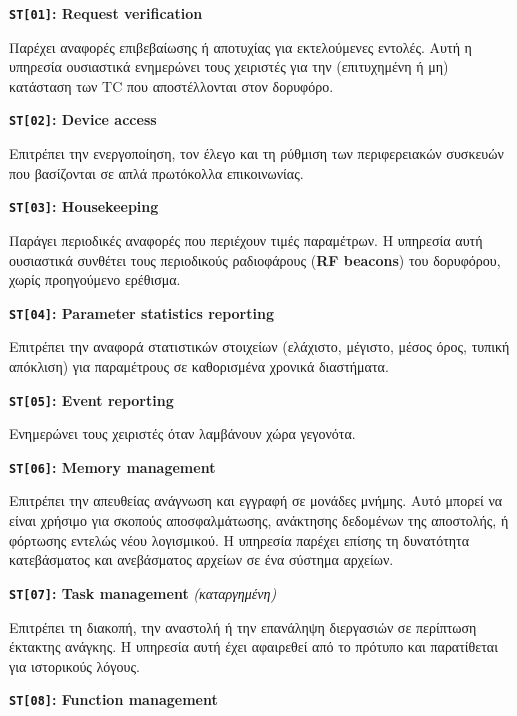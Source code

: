 \documentclass[a4paper,nobib]{tufte-book}
\begin{document}
\begin{compactitem}
	\item \textbf{\texttt{ST[01]}: Request verification}
	
	Παρέχει αναφορές επιβεβαίωσης ή αποτυχίας για εκτελούμενες εντολές. Αυτή η υπηρεσία ουσιαστικά ενημερώνει τους χειριστές για την (επιτυχημένη ή μη) κατάσταση των \ac{TC} που αποστέλλονται στον δορυφόρο.
	
	\item \textbf{\texttt{ST[02]}: Device access}
	
	Επιτρέπει την ενεργοποίηση, τον έλεγο και τη ρύθμιση των περιφερειακών συσκευών που βασίζονται σε απλά πρωτόκολλα επικοινωνίας.
	
	\item \textbf{\texttt{ST[03]}: Housekeeping}
		
		Παράγει περιοδικές αναφορές που περιέχουν τιμές παραμέτρων. Η υπηρεσία αυτή ουσιαστικά συνθέτει τους περιοδικούς ραδιοφάρους (\textbf{\acs{RF} beacons}) του δορυφόρου, χωρίς προηγούμενο ερέθισμα.
		
		\item \textbf{\texttt{ST[04]}: Parameter statistics reporting}
		
		Επιτρέπει την αναφορά στατιστικών στοιχείων (ελάχιστο, μέγιστο, μέσος όρος, τυπική απόκλιση) για παραμέτρους σε καθορισμένα χρονικά διαστήματα.
		
		\item \textbf{\texttt{ST[05]}: Event reporting}
		
		Ενημερώνει τους χειριστές όταν λαμβάνουν χώρα γεγονότα.
		
		\item \textbf{\texttt{ST[06]}: Memory management}
		
		Επιτρέπει την απευθείας ανάγνωση και εγγραφή σε μονάδες μνήμης. Αυτό μπορεί να είναι χρήσιμο για σκοπούς αποσφαλμάτωσης, ανάκτησης δεδομένων της αποστολής, ή φόρτωσης εντελώς νέου λογισμικού. Η υπηρεσία παρέχει επίσης τη δυνατότητα κατεβάσματος και ανεβάσματος αρχείων σε ένα σύστημα αρχείων.
		
		\item \textbf{\texttt{ST[07]}: Task management} \emph{(καταργημένη)}
		
		Επιτρέπει τη διακοπή, την αναστολή ή την επανάληψη διεργασιών σε περίπτωση έκτακτης ανάγκης. Η υπηρεσία αυτή έχει αφαιρεθεί από το πρότυπο και παρατίθεται για ιστορικούς λόγους.
		
		\item \textbf{\texttt{ST[08]}: Function management}
		

\end{compactitem}
\end{document}
